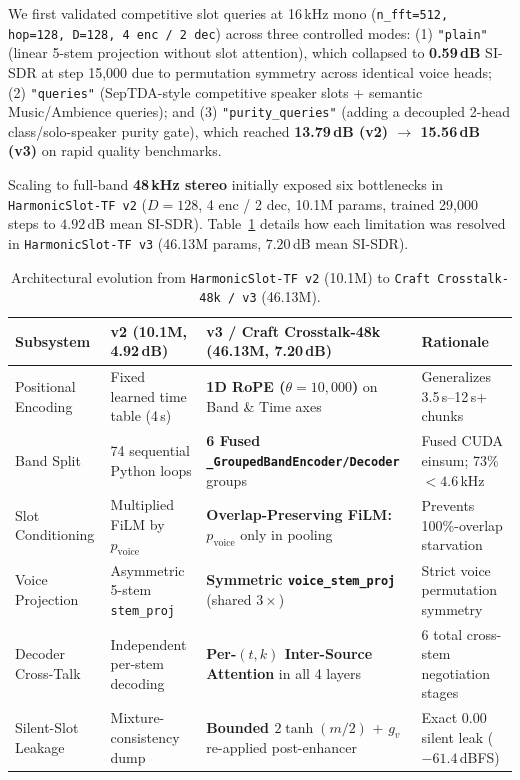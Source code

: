 \documentclass[10pt,a4paper]{article}
\begin{document}
We first validated competitive slot queries at 16\,kHz mono (\texttt{n\_fft=512, hop=128, D=128, 4 enc / 2 dec}) across three controlled modes: (1) \texttt{"plain"} (linear 5-stem projection without slot attention), which collapsed to \textbf{0.59\,dB} SI-SDR at step 15,000 due to permutation symmetry across identical voice heads; (2) \texttt{"queries"} (SepTDA-style competitive speaker slots + semantic Music/Ambience queries); and (3) \texttt{"purity\_queries"} (adding a decoupled 2-head class/solo-speaker purity gate), which reached \textbf{13.79\,dB (v2) $\to$ 15.56\,dB (v3)} on rapid quality benchmarks.

Scaling to full-band \textbf{48\,kHz stereo} initially exposed six bottlenecks in \texttt{HarmonicSlot-TF v2} ($D=128$, 4 enc / 2 dec, 10.1M params, trained 29,000 steps to $4.92$\,dB mean SI-SDR). Table~\ref{tab:v2_vs_v3} details how each limitation was resolved in \texttt{HarmonicSlot-TF v3} (46.13M params, $7.20$\,dB mean SI-SDR).

\begin{table}[h]
\centering
\caption{Architectural evolution from \texttt{HarmonicSlot-TF v2} (10.1M) to \texttt{Craft Crosstalk-48k / v3} (46.13M).}
\label{tab:v2_vs_v3}
\small
\begin{tabular}{llll}
\toprule
\textbf{Subsystem} & \textbf{v2 (10.1M, 4.92\,dB)} & \textbf{v3 / Craft Crosstalk-48k (46.13M, 7.20\,dB)} & \textbf{Rationale} \\
\midrule
Positional Encoding & Fixed learned time table (4\,s) & \textbf{1D RoPE ($\theta=10{,}000$)} on Band \& Time axes & Generalizes 3.5\,s--12\,s+ chunks \\
Band Split & 74 sequential Python loops & \textbf{6 Fused \texttt{\_GroupedBandEncoder/Decoder}} groups & Fused CUDA einsum; 73\% $<4.6$\,kHz \\
Slot Conditioning & Multiplied FiLM by $p_{\text{voice}}$ & \textbf{Overlap-Preserving FiLM:} $p_{\text{voice}}$ only in pooling & Prevents 100\%-overlap starvation \\
Voice Projection & Asymmetric 5-stem \texttt{stem\_proj} & \textbf{Symmetric \texttt{voice\_stem\_proj}} (shared $3\times$) & Strict voice permutation symmetry \\
Decoder Cross-Talk & Independent per-stem decoding & \textbf{Per-$(t,k)$ Inter-Source Attention} in all 4 layers & 6 total cross-stem negotiation stages \\
Silent-Slot Leakage & Mixture-consistency dump & \textbf{Bounded $2\tanh(m/2)$} + $g_v$ re-applied post-enhancer & Exact $0.00$ silent leak ($-61.4$\,dBFS) \\
\bottomrule
\end{tabular}
\end{table}
\end{document}
